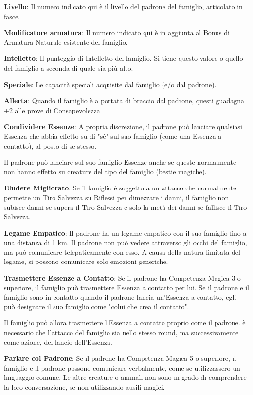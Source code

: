 \documentclass[a4paper,11pt,twoside,openany]{book}
\begin{document}
\textbf{Livello}: Il numero indicato qui è il livello del padrone del famiglio, articolato in fasce.

\textbf{Modificatore armatura}: Il numero indicato qui è in aggiunta al Bonus di Armatura Naturale esistente del famiglio.

\textbf{Intelletto}: Il punteggio di Intelletto del famiglio. Si tiene questo valore o quello del famiglio a seconda di quale sia più alto. 

\textbf{Speciale}: Le capacità speciali acquisite dal famiglio (e/o dal padrone).

\textbf{Allerta}: Quando il famiglio è a portata di braccio dal padrone, questi guadagna +2 alle prove di Consapevolezza

\textbf{Condividere Essenze}: A propria discrezione, il padrone può lanciare qualsiasi Essenza che abbia effetto su di "sé" sul suo famiglio (come una Essenza a contatto), al posto di se stesso.

Il padrone può lanciare sul suo famiglio Essenze anche se queste normalmente non hanno effetto su creature del tipo del famiglio (bestie magiche).

\textbf{Eludere Migliorato}: Se il famiglio è soggetto a un attacco che normalmente permette un Tiro Salvezza su Riflessi per dimezzare i danni, il famiglio non subisce danni se supera il Tiro Salvezza e solo la metà dei danni se fallisce il Tiro Salvezza.

\textbf{Legame Empatico}: Il padrone ha un legame empatico con il suo famiglio fino a una distanza di 1 km. Il padrone non può vedere attraverso gli occhi del famiglio, ma può comunicare telepaticamente con esso. A causa della natura limitata del legame, si possono comunicare solo emozioni generiche.

\textbf{Trasmettere Essenze a Contatto}: Se il padrone ha Competenza Magica 3 o superiore, il famiglio può trasmettere Essenza a contatto per lui. Se il padrone e il famiglio sono in contatto quando il padrone lancia un'Essenza a contatto, egli può designare il suo famiglio come "colui che crea il contatto".

Il famiglio può allora trasmettere l'Essenza a contatto proprio come il padrone. è necessario che l'attacco del famiglio sia nello stesso round, ma successivamente come azione, del lancio dell'Essenza.

\textbf{Parlare col Padrone}: Se il padrone ha Competenza Magica 5 o superiore, il famiglio e il padrone possono comunicare verbalmente, come se utilizzassero un linguaggio comune. Le altre creature o animali non sono in grado di comprendere la loro conversazione, se non utilizzando ausili magici.
\end{document}
